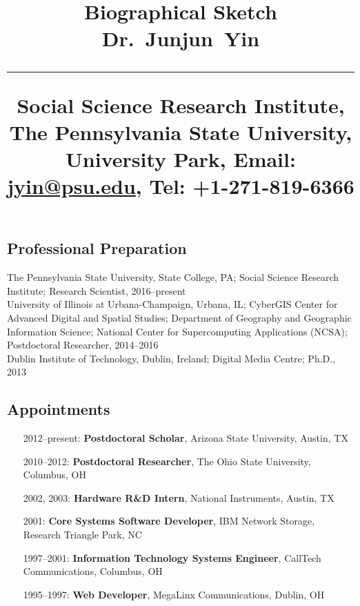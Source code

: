 \documentclass[a4paper,11pt]{article}
\title{%
        \vspace{-2\baselineskip}
            \normalsize
            Biographical Sketch\\
            {\large\textbf{Dr.~Junjun~Yin}}\\
            \vspace{0.5\baselineskip}
            \hrule
            \vspace{0.5\baselineskip}
            Social Science Research Institute, The Pennsylvania State University, University Park,
            Email: \href{mailto:jyin@psu.edu}{jyin@psu.edu},
            Tel: +1-271-819-6366
        \vspace{-1.5ex}
        }
\date{}
\author{}
\begin{document}
\maketitle
\vspace{-4\baselineskip}

\subsection{Professional Preparation}

    The Pennsylvania State University, State College, PA;
    	Social Science Research Institute;
        Research Scientist, 2016--present
        \\
    University of Illinois at Urbana-Champaign, Urbana, IL;
        CyberGIS Center for Advanced Digital and Spatial Studies; Department of Geography and Geographic Information Science; National Center for Supercomputing Applications (NCSA);
        Postdoctoral Researcher, 2014--2016
        \\
    Dublin Institute of Technology, Dublin, Ireland;
        Digital Media Centre;
        Ph.D., 2013

\subsection{Appointments}

\begin{itemize}[label={--9999:},leftmargin=*,itemsep=0pt]

    \item[2012--present:]
        \textbf{Postdoctoral Scholar},
        Arizona State University,
        Austin, TX

    \item[2010--2012:]
        \textbf{Postdoctoral Researcher},
        The Ohio State University,
        Columbus, OH

    \item[2002, 2003:]
        \textbf{Hardware R\&D Intern},
        National Instruments,
        Austin, TX

    \item[2001:]
        \textbf{Core Systems Software Developer},
        IBM Network Storage,
        Research Triangle Park, NC

    \item[1997--2001:]
        \textbf{Information Technology Systems Engineer},
        CallTech Communications,
        Columbus, OH

    \item[1995--1997:]
        \textbf{Web Developer},
        MegaLinx Communications,
        Dublin, OH

\end{itemize}
\end{document}
